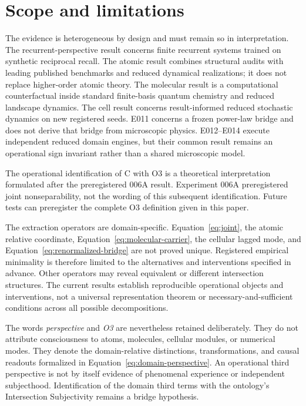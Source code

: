 \documentclass[11pt,a4paper]{article}
\begin{document}
\section{Scope and limitations}

The evidence is heterogeneous by design and must remain so in interpretation. The recurrent-perspective result concerns finite recurrent systems trained on synthetic reciprocal recall. The atomic result combines structural audits with leading published benchmarks and reduced dynamical realizations; it does not replace higher-order atomic theory. The molecular result is a computational counterfactual inside standard finite-basis quantum chemistry and reduced landscape dynamics. The cell result concerns result-informed reduced stochastic dynamics on new registered seeds. E011 concerns a frozen power-law bridge and does not derive that bridge from microscopic physics. E012--E014 execute independent reduced domain engines, but their common result remains an operational sign invariant rather than a shared microscopic model.

The operational identification of C with O3 is a theoretical interpretation formulated after the preregistered 006A result. Experiment 006A preregistered joint nonseparability, not the wording of this subsequent identification. Future tests can preregister the complete O3 definition given in this paper.

The extraction operators are domain-specific. Equation~\eqref{eq:joint}, the atomic relative coordinate, Equation~\eqref{eq:molecular-carrier}, the cellular lagged mode, and Equation~\eqref{eq:renormalized-bridge} are not proved unique. Registered empirical minimality is therefore limited to the alternatives and interventions specified in advance. Other operators may reveal equivalent or different intersection structures. The current results establish reproducible operational objects and interventions, not a universal representation theorem or necessary-and-sufficient conditions across all possible decompositions.

The words \emph{perspective} and \emph{O3} are nevertheless retained deliberately. They do not attribute consciousness to atoms, molecules, cellular modules, or numerical modes. They denote the domain-relative distinctions, transformations, and causal readouts formalized in Equation~\eqref{eq:domain-perspective}. An operational third perspective is not by itself evidence of phenomenal experience or independent subjecthood. Identification of the domain third terms with the ontology's Intersection Subjectivity remains a bridge hypothesis.
\end{document}
